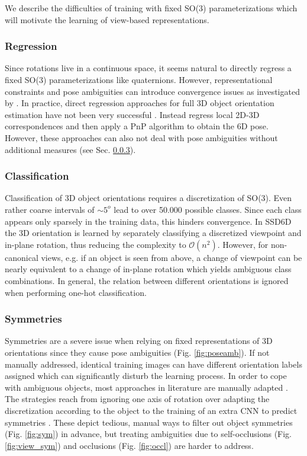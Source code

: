 We describe the difficulties of training with fixed SO(3) parameterizations which will motivate the learning of view-based representations. 

\subsubsection{Regression} 

Since rotations live in a continuous space, it seems natural to directly regress a fixed SO(3) parameterizations like quaternions. However, representational constraints and pose ambiguities can introduce convergence issues as investigated by \cite{saxena2009learning}. In practice, direct regression approaches for full 3D object orientation estimation have not been very successful \citep{mahendran20173d}. Instead \cite{tremblay2018deep,tekin2017real,rad2017bb8} regress local 2D-3D correspondences and then apply a \gls{PnP} algorithm to obtain the 6D pose. However, these approaches can also not deal with pose ambiguities without additional measures (see Sec. \ref{sec:sym}).

\subsubsection{Classification} 

Classification of 3D object orientations requires a discretization of SO(3). Even rather coarse intervals of $\sim 5^o$ lead to over 50.000 possible classes. Since each class appears only sparsely in the training data, this hinders convergence. In SSD6D \citep{kehl2017ssd} the 3D orientation is learned by separately classifying a discretized viewpoint and in-plane rotation, thus reducing the complexity to $\mathcal{O}(n^2)$. However, for non-canonical views, e.g. if an object is seen from above, a change of viewpoint can be nearly equivalent to a change of in-plane rotation which yields ambiguous class combinations. In general, the relation between different orientations is ignored when performing one-hot classification.

\subsubsection{Symmetries} 
\label{sec:sym}
Symmetries are a severe issue when relying on fixed representations of 3D orientations since they cause pose ambiguities (Fig. \ref{fig:poseamb}). If not manually addressed, identical training images can have different orientation labels assigned which can significantly disturb the learning process. In order to cope with ambiguous objects, most approaches in literature are manually adapted \citep{wohlhart2015learning,hinterstoisser2012gradient,kehl2017ssd,rad2017bb8}. The strategies reach from ignoring one axis of rotation \citep{wohlhart2015learning,hinterstoisser2012gradient} over adapting the discretization according to the object \citep{kehl2017ssd} to the training of an extra \gls{CNN} to predict symmetries \citep{rad2017bb8}. These depict tedious, manual ways to filter out object symmetries (Fig. \ref{fig:sym}) in advance, but treating ambiguities due to self-occlusions (Fig. \ref{fig:view_sym}) and occlusions (Fig. \ref{fig:occl}) are harder to address. 

